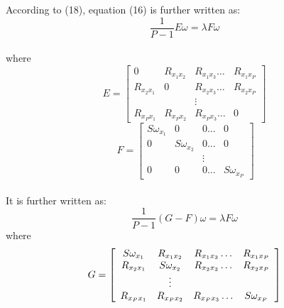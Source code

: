 \documentclass[journal]{IEEEtran}
\begin{document}
According to (18), equation (16) is further written as: \\
 \begin{equation} \frac{1}{{P - 1}}E\omega  = \lambda F\omega \end{equation} \\ where
 \begin{equation} E = \left[ {\begin{array}{*{20}{c}}
0&{{R_{{x_1}{x_2}}}}&{{R_{{x_1}{x_3}}} \ldots }&{{R_{{x_1}{x_P}}}}\\
{{R_{{x_2}{x_1}}}}&0&{{R_{{x_2}{x_3}}} \ldots }&{{R_{{x_2}{x_P}}}}\\
{}&{}& \vdots &{}\\
{{R_{{x_P}{x_1}}}}&{{R_{{x_P}{x_2}}}}&{{R_{{x_P}{x_3}}} \ldots }&0
\end{array}} \right] \end{equation}
\begin{equation}\ F = \left[ {\begin{array}{*{20}{c}}
{S{\omega_{{x_1}}}}&0&{0 \ldots }&0\\
0&{S{\omega_{{x_2}}}}&{0 \ldots }&0\\
{}&{}& \vdots &{}\\
0&0&{0 \ldots }&{S{\omega_{{x_P}}}}
\end{array}} \right]        \end{equation}
\\\indent It is further written as:
\begin{equation} \frac{1}{{P - 1}}(G - F)\omega  = \lambda F\omega \end{equation}
where
\begin{equation}
{G = \left[ {\begin{array}{*{20}{c}}
   {S{\omega _{{x_1}}}} & {{R_{{x_1}{x_2}}}} & {{R_{{x_1}{x_3}}} \ldots } & {{R_{{x_1}{x_P}}}}  \\
   {{R_{{x_2}{x_1}}}} & {S{\omega _{{x_2}}}} & {{R_{{x_2}{x_3}}} \ldots } & {{R_{{x_2}{x_P}}}}  \\
   {} & {{\rm{             }} \vdots } & {} & {}  \\
   {{R_{{x_P}{x_1}}}} & {{R_{{x_P}{x_2}}}} & {{R_{{x_P}{x_3}}} \ldots } & {S{\omega _{{x_P}}}}  \\
\end{array}} \right]}
\end{equation}
\end{document}
